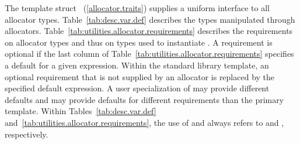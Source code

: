 \pnum
The template struct ~(\ref{allocator.traits}) supplies
a uniform interface to all allocator types.
Table~\ref{tab:desc.var.def} describes the types manipulated
through allocators. Table~\ref{tab:utilities.allocator.requirements}
describes the requirements on allocator types
and thus on types used to instantiate . A requirement
is optional if the last column of
Table~\ref{tab:utilities.allocator.requirements} specifies a default for a
given expression. Within the standard library 
template, an optional requirement that is not supplied by an allocator is
replaced by the specified default expression. A user specialization of
 may provide different defaults and may provide
defaults for different requirements than the primary template. Within
Tables~\ref{tab:desc.var.def} and~\ref{tab:utilities.allocator.requirements},
the use of  and  always refers to 
and , respectively.

